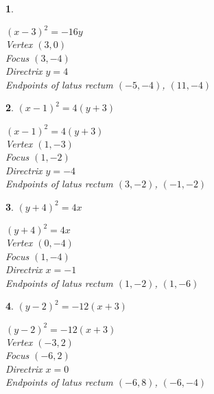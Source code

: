 \documentclass{amsbook}
\newtheorem{exc}{}
\newenvironment{ex}{\begin{exc}\normalfont}{\end{exc}}
\numberwithin{section}{chapter}
\numberwithin{equation}{chapter}
\begin{document}
\begin{multicols}{2}
\begin{ex}
\begin{sol}
		{\small $(x - 3)^{2} = -16y$}\\
		{\small Vertex $(3, 0)$}\\
		{\small Focus $(3, -4)$}\\
		{\small Directrix $y = 4$}\\
		{\small Endpoints of latus rectum $(-5, -4)$, $(11, -4)$}\\
	\end{sol}
\end{ex}
\begin{ex}
	$(x-1)^2 = 4(y+3)$
	\begin{sol}
		{\small $(x-1)^2 = 4(y+3)$}\\
		{\small Vertex $\left(1, -3\right)$}\\
		{\small Focus $\left(1, -2 \right)$}\\
		{\small Directrix $y = -4$}\\
		{\small Endpoints of latus rectum $\left(3, -2 \right)$, $\left(-1, -2 \right)$}\\
	\end{sol}
\end{ex}
\begin{comment}
\begin{ex}
	$\left(x + \frac{7}{3}\right)^{2} = 2\left(y + \frac{5}{2}\right)$
	\begin{sol}
		{\small $\left(x + \frac{7}{3}\right)^{2} = 2\left(y + \frac{5}{2}\right)$}\\
		{\small Vertex $\left(-\frac{7}{3}, -\frac{5}{2} \right)$}\\
		{\small Focus $\left(-\frac{7}{3}, -2 \right)$}\\
		{\small Directrix $y = -3$}\\
		{\small Endpoints of latus rectum $\left(-\frac{10}{3}, -2 \right)$, $\left(-\frac{4}{3}, -2 \right)$}\\
	\end{sol}
\end{ex}
\end{comment}
\begin{ex}
	$(y + 4)^{2} = 4x$
	\begin{sol}
		{\small $(y + 4)^{2} = 4x$}\\
		{\small Vertex $(0,-4)$} \\
		{\small Focus $(1,-4)$} \\
		{\small Directrix $x = -1$}\\
		{\small Endpoints of latus rectum $(1, -2)$, $(1, -6)$}\\
	\end{sol}
\end{ex}
\begin{ex}
	$(y - 2)^{2} = -12(x + 3)$ 
	\begin{sol}
	{\small $(y - 2)^{2} = -12(x + 3)$} \\
	{\small Vertex $(-3, 2)$} \\
	{\small Focus $(-6, 2)$} \\
	{\small Directrix $x = 0$}\\
	{\small Endpoints of latus rectum $(-6, 8)$, $(-6, -4)$}\\	
	\end{sol}
\end{ex}



\end{multicols}
\end{document}
